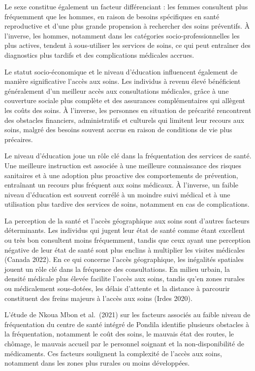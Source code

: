 \documentclass[
]{article}
\begin{document}
Le sexe constitue également un facteur différenciant : les femmes
consultent plus fréquemment que les hommes, en raison de besoins
spécifiques en santé reproductive et d'une plus grande propension à
rechercher des soins préventifs. À l'inverse, les hommes, notamment dans
les catégories socio-professionnelles les plus actives, tendent à
sous-utiliser les services de soins, ce qui peut entraîner des
diagnostics plus tardifs et des complications médicales accrues.

Le statut socio-économique et le niveau d'éducation influencent
également de manière significative l'accès aux soins. Les individus à
revenu élevé bénéficient généralement d'un meilleur accès aux
consultations médicales, grâce à une couverture sociale plus complète et
des assurances complémentaires qui allègent les coûts des soins. À
l'inverse, les personnes en situation de précarité rencontrent des
obstacles financiers, administratifs et culturels qui limitent leur
recours aux soins, malgré des besoins souvent accrus en raison de
conditions de vie plus précaires.

Le niveau d'éducation joue un rôle clé dans la fréquentation des
services de santé. Une meilleure instruction est associée à une
meilleure connaissance des risques sanitaires et à une adoption plus
proactive des comportements de prévention, entraînant un recours plus
fréquent aux soins médicaux. À l'inverse, un faible niveau d'éducation
est souvent corrélé à un moindre suivi médical et à une utilisation plus
tardive des services de soins, notamment en cas de complications.

La perception de la santé et l'accès géographique aux soins sont
d'autres facteurs déterminants. Les individus qui jugent leur état de
santé comme étant excellent ou très bon consultent moins fréquemment,
tandis que ceux ayant une perception négative de leur état de santé sont
plus enclins à multiplier les visites médicales (Canada 2022). En ce qui
concerne l'accès géographique, les inégalités spatiales jouent un rôle
clé dans la fréquence des consultations. En milieu urbain, la densité
médicale plus élevée facilite l'accès aux soins, tandis qu'en zones
rurales ou médicalement sous-dotées, les délais d'attente et la distance
à parcourir constituent des freins majeurs à l'accès aux soins (Irdes
2020).

L'étude de Nkoua Mbon et al.~(2021) sur les facteurs associés au faible
niveau de fréquentation du centre de santé intégré de Pondila identifie
plusieurs obstacles à la fréquentation, notamment le coût des soins, le
mauvais état des routes, le chômage, le mauvais accueil par le personnel
soignant et la non-disponibilité de médicaments. Ces facteurs soulignent
la complexité de l'accès aux soins, notamment dans les zones plus
rurales ou moins développées.
\end{document}
